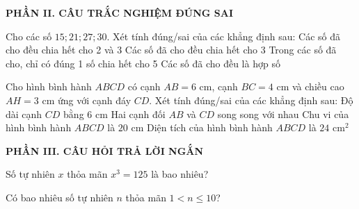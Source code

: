 \documentclass[12pt,a4paper]{article}
\begin{document}
\setcounter{ex}{0}
\vspace{2mm}
\noindent\textbf{\large PHẦN II. CÂU TRẮC NGHIỆM ĐÚNG SAI}
\vspace{1mm}
\begin{ex}
Cho các số $15; 21; 27; 30$. Xét tính đúng/sai của các khẳng định sau:
\choiceTF
{Các số đã cho đều chia hết cho 2 và 3}
{\True Các số đã cho đều chia hết cho 3}
{Trong các số đã cho, chỉ có đúng 1 số chia hết cho 5}
{\True Các số đã cho đều là hợp số}
\end{ex}

\begin{ex}
Cho hình bình hành $ABCD$ có cạnh $AB = 6\text{ cm}$, cạnh $BC = 4\text{ cm}$ và chiều cao $AH = 3\text{ cm}$ ứng với cạnh đáy $CD$. Xét tính đúng/sai của các khẳng định sau:
\choiceTF
{\True Độ dài cạnh $CD$ bằng $6\text{ cm}$}
{\True Hai cạnh đối $AB$ và $CD$ song song với nhau}
{\True Chu vi của hình bình hành $ABCD$ là $20\text{ cm}$}
{Diện tích của hình bình hành $ABCD$ là $24\text{ cm}^2$}
\end{ex}


\setcounter{ex}{0}
\vspace{2mm}
\noindent\textbf{\large PHẦN III. CÂU HỎI TRẢ LỜI NGẮN}
\vspace{1mm}
\begin{ex}
Số tự nhiên $x$ thỏa mãn $x^3 = 125$ là bao nhiêu? 
\end{ex}

\begin{ex}
Có bao nhiêu số tự nhiên $n$ thỏa mãn $1 < n \le 10$? 
\end{ex}
\end{document}
